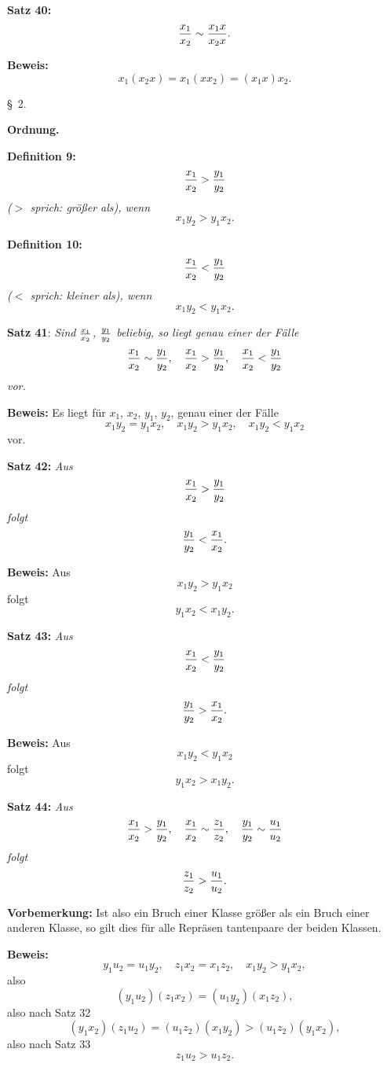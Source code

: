 {\bf Satz 40:} {\it $${x_1 \over x_2} \sim {x_1 x \over x_2 x}.$$}%

{\bf Beweis:} $$x_1 (x_2 x) = x_1 (x x_2) = (x_1 x) x_2.$$
\vfill\eject



\line{}\baselineskip
\centerline{{\S}~2.}
\medskip

\centerline{\bf Ordnung.}
\bigskip

{\bf Definition 9:} {\it $${x_1 \over x_2} > {y_1 \over y_2}$$
{\rm ($>$ sprich: gr\"o{\ss}er als),} wenn
$$x_1 y_2 > y_1 x_2.$$}%
\medskip


{\bf Definition 10:} {\it $${x_1 \over x_2} < {y_1 \over y_2}$$
{\rm ($<$ sprich: kleiner als),} wenn
$$x_1 y_2 < y_1 x_2.$$}%
\medskip


{\bf Satz 41}: {\it Sind $x_1 \over x_2$, $y_1 \over y_2$ beliebig, so liegt genau einer der F\"alle
$${x_1 \over x_2} \sim {y_1 \over y_2},\quad {x_1 \over x_2} > {y_1 \over y_2},\quad {x_1 \over x_2} < {y_1 \over y_2}$$
vor.}

{\bf Beweis:} Es liegt f\"ur $x_1$, $x_2$, $y_1$, $y_2$, genau einer der F\"alle
$$x_1 y_2 = y_1 x_2,\quad x_1 y_2 > y_1 x_2,\quad x_1 y_2 < y_1 x_2$$
vor.
\medskip


{\bf Satz 42:} {\it Aus
$${x_1 \over x_2} > {y_1 \over y_2}$$
folgt
$${y_1 \over y_2} < {x_1 \over x_2}.$$}%

{\bf Beweis:} Aus
$$x_1 y_2 > y_1 x_2$$
folgt
$$y_1 x_2 < x_1 y_2.$$
\medskip


{\bf Satz 43:} {\it Aus
$${x_1 \over x_2} < {y_1 \over y_2}$$
folgt
$${y_1 \over y_2} > {x_1 \over x_2}.$$}%

{\bf Beweis:} Aus
$$x_1 y_2 < y_1 x_2$$
folgt
$$y_1 x_2 > x_1 y_2.$$
\medskip


{\bf Satz 44:} {\it Aus
$${x_1 \over x_2} > {y_1 \over y_2},\quad {x_1 \over x_2} \sim {z_1 \over z_2},\quad {y_1 \over y_2} \sim {u_1 \over u_2}$$
folgt
$${z_1 \over z_2} > {u_1 \over u_2}.$$}%

{\bf Vorbemerkung:} Ist also ein Bruch einer Klasse gr\"o{\ss}er als
ein Bruch einer anderen Klasse, so gilt dies f\"ur alle Repr\"asen%
tantenpaare der beiden Klassen.

{\bf Beweis:} $$y_1 u_2 = u_1 y_2,\quad z_1 x_2 = x_1 z_2,\quad x_1 y_2 > y_1 x_2,$$
also
$$(y_1 u_2)(z_1 x_2) = (u_1 y_2)(x_1 z_2),$$
also nach Satz 32
$$(y_1 x_2)(z_1 u_2) = (u_1 z_2)(x_1 y_2) > (u_1 z_2)(y_1 x_2),$$
also nach Satz 33
$$z_1 u_2 > u_1 z_2.$$
\medskip

